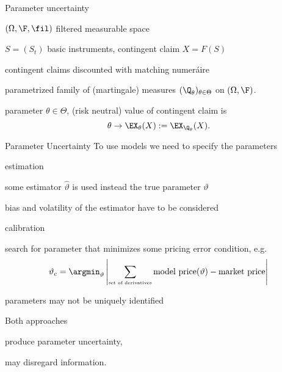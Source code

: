 {Parameter uncertainty}






	$(\Omega, \F, \fil)$ filtered measurable space


	$S= (S_t)$ basic instruments, contingent claim $X=F(S)$
%

	contingent claims discounted with matching numer{\'a}ire


	parametrized family of (martingale) measures $(\Q_\theta)_{\theta \in \Theta}$ on $(\Omega, \F)$.


	parameter $\theta \in \Theta$, (risk neutral) value of contingent claim is
$$
\theta \rightarrow \EX_\theta(X) := \EX_{\Q_\theta}(X).
$$






{Parameter Uncertainty}
To use models we need to specify the parameters






	estimation






	some estimator $\hat{\vartheta}$ is used instead the true parameter $\vartheta$


	bias and volatility of the estimator have to be considered






	calibration






	search for parameter that minimizes some pricing error condition, e.g.
$$
\vartheta_c = \argmin_{\vartheta} \left| \sum_{\mbox{\tiny set of derivatives}} \mbox{model price} (\vartheta) - \mbox{market price} \right|
$$


	parameters may not be uniquely identified






	Both approaches






	produce parameter uncertainty,


	may disregard information.






